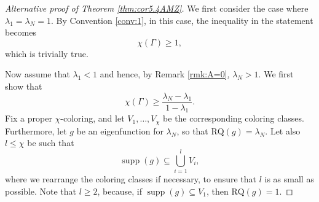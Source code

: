 \documentclass[10pt,a4paper]{amsart}
\DeclareMathOperator{\supp}{supp}
\newcommand{\RQ}{\textrm{RQ}}
\begin{document}
\begin{proof}[Alternative proof of Theorem \ref{thm:cor5.4AMZ}]
    We first consider the case where $\lambda_1 = \lambda_N = 1$. By Convention \ref{conv:1}, in this case, the inequality in the statement becomes
    \[
    \chi(\Gamma)\geq 1,
    \]
    which is trivially true.

    Now assume that $\lambda_1<1$ and hence, by Remark \ref{rmk:A=0}, $\lambda_N > 1$.
    We first show that $$\chi(\Gamma)\geq \frac{\lambda_N-\lambda_1}{1-\lambda_1}.$$ Fix a proper $\chi$-coloring, and let $V_1,\ldots,V_\chi$ be the corresponding coloring classes. Furthermore, let $g$ be an eigenfunction for $\lambda_N$, so that $\RQ(g)=\lambda_N$.
    Let also $l\leq \chi$ be such that
    \[
    \supp(g)\subseteq \bigcup_{i=1}^lV_i,
    \]
    where we rearrange the coloring classes if necessary, to ensure that $l$ is as small as possible. Note that $l\geq2$, because, if $\supp(g)\subseteq V_1$, then $\RQ(g)= 1$.


\end{proof}
\end{document}
